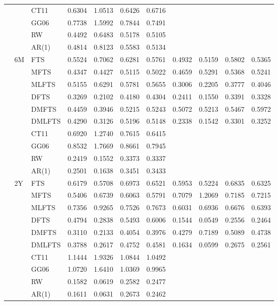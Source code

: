 \documentclass[12pt,a4paper]{article}
\begin{document}
\begin{center}
\begin{small}
\begin{longtable}{@{}lllcccccccc@{}}
& & CT11 & 0.6304 & 1.0513 & 0.6426 & 0.6716 \\
& & GG06 & 0.7738 & 1.5992 & 0.7844 & 0.7491 \\
& & RW & 0.4492 & 0.6483 & 0.5178 & 0.5105 \\
& & AR(1) & 0.4814 & 0.8123 & 0.5583 & 0.5134 \\
  \cmidrule{2-11}
  & 6M & FTS & 0.5524 & 0.7062 & 0.6281 & 0.5761 & 0.4932 & 0.5159 & 0.5802 & 0.5365 \\ 
& & MFTS & 0.4347 & 0.4427 & 0.5115 & 0.5022 & 0.4659 & 0.5291 & 0.5368 & 0.5241 \\ 
& & MLFTS & 0.5155 & 0.6291 & 0.5781 & 0.5655 & 0.3006 & 0.2205 & 0.3777 & 0.4046 \\
& & DFTS & 0.3269 & 0.2102 & 0.4180 & 0.4304 & 0.2411 & 0.1550 & 0.3391 & 0.3328 \\ 
& & DMFTS & 0.4459 & 0.3946 & 0.5215 & 0.5243 & 0.5072 & 0.5213 & 0.5467 & 0.5972 \\ 
& & DMLFTS & 0.4290 & 0.3126 & 0.5196 & 0.5148 & 0.2338 & 0.1542 & 0.3301 & 0.3252 \\
& & CT11 & 0.6920 & 1.2740 & 0.7615 & 0.6415 \\
& & GG06 & 0.8532 & 1.7669 & 0.8661 & 0.7945 \\
& & RW & 0.2419 & 0.1552 & 0.3373 & 0.3337 \\
& & AR(1) & 0.2501 & 0.1638 & 0.3451 & 0.3433 \\
  \cmidrule{2-11}
    & 2Y & FTS & 0.6179 & 0.5708 & 0.6973 & 0.6521 & 0.5953 & 0.5224 & 0.6835 & 0.6325 \\ 
& & MFTS & 0.5406 & 0.6739 & 0.6063 & 0.5791 & 0.7079 & 1.2069 & 0.7185 & 0.7215 \\ 
& & MLFTS & 0.7356 & 0.9265 & 0.7526 & 0.7673 & 0.6031 & 0.6936 & 0.6676 & 0.6393 \\
& & DFTS & 0.4794 & 0.2838 & 0.5493 & 0.6006 & 0.1544 & 0.0549 & 0.2556 & 0.2464 \\ 
& & DMFTS & 0.3110 & 0.2133 & 0.4054 & 0.3976 & 0.4279 & 0.7189 & 0.5089 & 0.4738 \\ 
& & DMLFTS & 0.3788 & 0.2617 & 0.4752 & 0.4581 & 0.1634 & 0.0599 & 0.2675 & 0.2561 \\
& & CT11 & 1.1444 & 1.9326 & 1.0844 & 1.0492 \\
& & GG06 & 1.0720 & 1.6410 & 1.0369 & 0.9965 \\
& & RW & 0.1582 & 0.0619 & 0.2582 & 0.2477 \\
& & AR(1) & 0.1611 & 0.0631 & 0.2673 & 0.2462 \\

\end{longtable}
\end{small}
\end{center}
\end{document}
